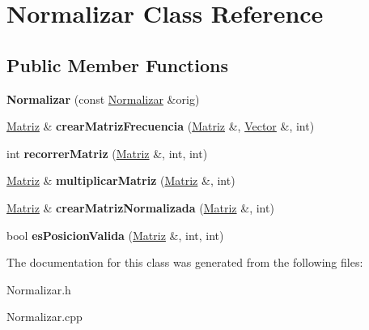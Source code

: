 \hypertarget{class_normalizar}{}\section{Normalizar Class Reference}
\label{class_normalizar}
\subsection*{Public Member Functions}
\begin{DoxyCompactItemize}
\item 
\mbox{\label{class_normalizar_a8fb095f4ce32c5d8dabebbf93ff88c43}} 
{\bfseries Normalizar} (const \hyperlink{class_normalizar}{Normalizar} \&orig)
\item 
\mbox{\label{class_normalizar_a3d5b79a13b31ad424f6b6eeb06d745e9}} 
\hyperlink{class_matriz}{Matriz} \& {\bfseries crear\+Matriz\+Frecuencia} (\hyperlink{class_matriz}{Matriz} \&, \hyperlink{class_vector}{Vector} \&, int)
\item 
\mbox{\label{class_normalizar_af9e1a58f798209f65d632b454bc635d3}} 
int {\bfseries recorrer\+Matriz} (\hyperlink{class_matriz}{Matriz} \&, int, int)
\item 
\mbox{\label{class_normalizar_a68d6e682bf07162271e2f75cfc8814ed}} 
\hyperlink{class_matriz}{Matriz} \& {\bfseries multiplicar\+Matriz} (\hyperlink{class_matriz}{Matriz} \&, int)
\item 
\mbox{\label{class_normalizar_a83eca7b0b7ad014523e9c01117d21430}} 
\hyperlink{class_matriz}{Matriz} \& {\bfseries crear\+Matriz\+Normalizada} (\hyperlink{class_matriz}{Matriz} \&, int)
\item 
\mbox{\label{class_normalizar_afffc49845866f1a2bfde224b24063f97}} 
bool {\bfseries es\+Posicion\+Valida} (\hyperlink{class_matriz}{Matriz} \&, int, int)
\end{DoxyCompactItemize}


The documentation for this class was generated from the following files\+:\begin{DoxyCompactItemize}
\item 
Normalizar.\+h\item 
Normalizar.\+cpp\end{DoxyCompactItemize}
